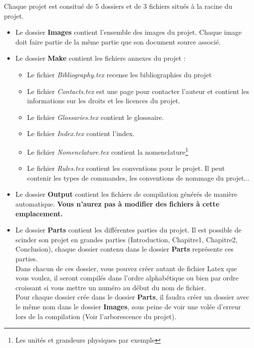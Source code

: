 \documentclass[12pt]{report}
\newcommand{\Triangle}{$\blacktriangleright$}
\newenvironment{items}[2]
{      
        \begin{itemize}[font=\color{#1}, label=#2]  
    }
    { 
        \end{itemize}
}%
\renewcommand{\bold}[1]{\textbf{#1}}
\newcommand{\italic}[1]{\textit{#1}}
\begin{document}
    Chaque projet est consitué de 5 dossiers et de 3 fichiers situés à la racine du projet.


    \begin{items}{blue}{\Triangle}
    \item Le dossier \bold{Images} contient l'ensemble des images du projet.
    Chaque image doit faire partie de la même partie que son document source associé.
    \item Le dossier \bold{Make} contient les fichiers annexes du projet : 
    \begin{items}{cyan}{\Triangle}
        \item Le fichier \italic{Bibliography.tex} recense les bibliographies du projet
        \item Le fichier \italic{Contacts.tex} est une page pour contacter l'auteur et contient les informations sur les droits et les licences du projet.
        \item Le fichier \italic{Glossaries.tex} contient le glosssaire.
        \item Le fichier \italic{Index.tex} contient l'index.
        \item Le fichier \italic{Nomenclature.tex} contient la nomenclature\footnote{Les unités et grandeurs physiques par exemple}
        \item Le fichier \italic{Rules.tex} contient les conventions pour le projet. Il peut contenir les types de commandes, les conventions de nommage du projet...
    
    \end{items}
    \item Le dossier \bold{Output} contient les fichiers de compilation générés de manière automatique. \bold{Vous n'aurez pas à modifier des fichiers à cette emplacement.}
    \item Le dossier \bold{Parts} contient les différentes parties du projet. Il est possible de scinder son projet en grandes parties (Introduction, Chapitre1, Chapitre2, Conclusion), chaque dossier contenu dans le dossier \bold{Parts} représente ces parties.\\

    Dans chacun de ces dossier, vous pouvez créer autant de fichier Latex que vous voulez, il seront compilés dans l'ordre alphabétique ou bien par ordre croissant si vous mettre un numéro au début du nom de fichier.\\

    Pour chaque dossier crée dans le dossier \bold{Parts}, il faudra créer un dossier avec le même nom dans le dossier \bold{Images}, sous peine de voir une volée d'erreur lors de la compilation (Voir l'arborescence du projet).
    

\end{items}
\end{document}
